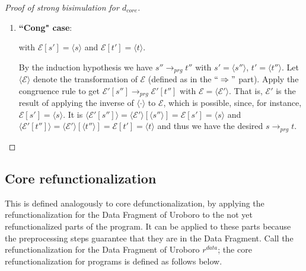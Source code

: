\begin{proof}[Proof of strong bisimulation for $d_{core}$]
\begin{enumerate}
were $prg'$ a well-typed program with copattern coverage for all subterms of $s$. Both of those properties can be shown or simulated similarly to the way they are in the $`` \Rightarrow "$ part.

But it is $prg' \subseteq prg$, as can be seen in the definition of $d''$. This implies the desired $s \longrightarrow_{prg} t$.

\item \textbf{``Cong" case}:

\begin{prooftree}
\end{prooftree}

with $\mathcal{E}[s'] = \langle s \rangle$ and $\mathcal{E}[t'] = \langle t \rangle$.

By the induction hypothesis we have $s'' \longrightarrow_{prg} t''$ with $s' = \langle s'' \rangle$, $t' = \langle t'' \rangle$. Let $\langle \mathcal{E} \rangle$ denote the transformation of $\mathcal{E}$ (defined as in the $`` \Rightarrow "$ part). Apply the congruence rule to get $\mathcal{E}'[s''] \longrightarrow_{prg} \mathcal{E}'[t'']$ with $\mathcal{E} = \langle \mathcal{E}' \rangle$. That is, $\mathcal{E}'$ is the result of applying the inverse of $\langle \cdot \rangle$ to $\mathcal{E}$, which is possible, since, for instance, $\mathcal{E}[s'] = \langle s \rangle$. It is $\langle \mathcal{E}'[s''] \rangle = \langle \mathcal{E}' \rangle[\langle s'' \rangle] = \mathcal{E}[s'] = \langle s \rangle$ and $\langle \mathcal{E}'[t''] \rangle = \langle \mathcal{E}' \rangle[\langle t'' \rangle] = \mathcal{E}[t'] = \langle t \rangle$ and thus we have the desired $s \longrightarrow_{prg} t$.
\end{enumerate}

\end{proof}

\subsection{Core refunctionalization}

This is defined analogously to core defunctionalization, by applying the refunctionalization for the Data Fragment of Uroboro to the not yet refunctionalized parts of the program. It can be applied to these parts because the preprocessing steps guarantee that they are in the Data Fragment. Call the refunctionalization for the Data Fragment of Uroboro $r^{data}$; the core refunctionalization for programs is defined as follows below.

